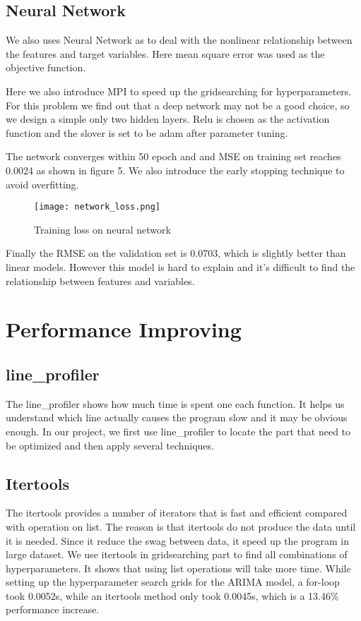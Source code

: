 \documentclass[article, 10 pt, conference]{ieeeconf}
\begin{document}
\subsection{Neural Network}

We also uses Neural Network as to deal with the nonlinear relationship between the features and target variables. Here mean square error was used as the objective function.

Here we also introduce MPI to speed up the gridsearching for hyperparameters. For this problem we find out that a deep network may not be a good choice, so we design a simple only two hidden layers. Relu is chosen as the activation function and the slover is set to be adam after parameter tuning.

The network converges within 50 epoch and and MSE on training set reaches 0.0024 as shown in figure 5. We also introduce the early stopping technique to avoid overfitting.
\begin{figure}[!htb]
    \texttt{[image: network\_loss.png]}
    \caption{Training loss on neural network}
\end{figure}

Finally the RMSE on the validation set is 0.0703, which is slightly better than linear models. However this model is hard to explain and it's difficult to find the relationship between features and variables.


\section{Performance Improving}
\subsection{line\_profiler}
The line\_profiler shows how much time is spent one each function. It helps us understand which line actually causes the program slow and it may be obvious enough. In our project, we first use line\_profiler to locate the part that need to be optimized and then apply several techniques.
\subsection{Itertools}
The itertools provides a number of iterators that is fast and efficient compared with operation on list. The reason is that itertools do not produce the data until it is needed. Since it reduce the swag between data, it speed up the program in large dataset. We use itertools in gridsearching part to find all combinations of hyperparameters. It shows that using list operations will take more time. While setting up the hyperparameter search grids for the ARIMA model, a for-loop took 0.0052s, while an itertools method only took 0.0045s, which is a 13.46\% performance increase. 
\end{document}
